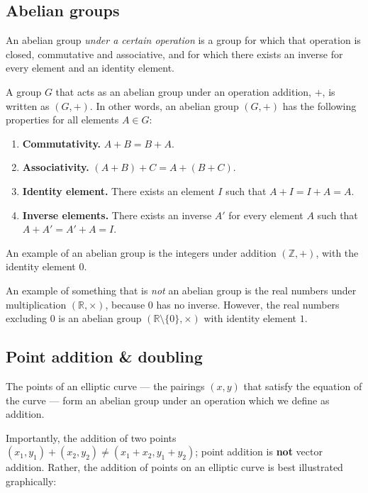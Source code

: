 \documentclass[a4paper]{article}
\begin{document}
\subsection{Abelian groups}

An abelian group \textit{under a certain operation} is a group for which that operation is closed, commutative and associative, and for which there exists an inverse for every element and an identity element.\cite[p. 11]{wp}

A group $G$ that acts as an abelian group under an operation addition, $+$, is written as $(G, +)$. In other words, an abelian group $(G, +)$ has the following properties for all elements $A \in G$:
\begin{enumerate}
    \item \textbf{Commutativity.} $A + B = B + A$.
    \item \textbf{Associativity.} $(A + B) + C = A + (B + C)$.
    \item \textbf{Identity element.} There exists an element $I$ such that $A + I = I + A = A$.
    \item \textbf{Inverse elements.} There exists an inverse $A'$ for every element $A$ such that $A + A' = A' + A = I$.\cite[p. 11]{guide}
\end{enumerate}

An example of an abelian group is the integers under addition $(\mathbb{Z}, +)$, with the identity element $0$. 

An example of something that is \textit{not} an abelian group is the real numbers under multiplication $(\mathbb{R}, \times)$, because $0$ has no inverse. However, the real numbers excluding $0$ is an abelian group $(\mathbb{R} \setminus \{0\}, \times)$ with identity element $1$.

\subsection{Point addition \& doubling}

The points of an elliptic curve --- the pairings $(x,y)$ that satisfy the equation of the curve --- form an abelian group under an operation which we define as addition. 

Importantly, the addition of two points $(x_1, y_1) + (x_2, y_2) \ne (x_1 + x_2, y_1 + y_2)$; point addition is \textbf{not} vector addition. Rather, the addition of points on an elliptic curve is best illustrated graphically:
\end{document}
